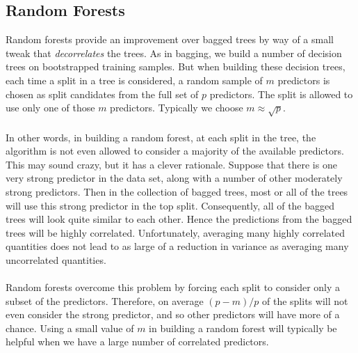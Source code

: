 \subsection{Random Forests}
Random forests provide an improvement over bagged trees by way of a small tweak that \textit{decorrelates} the trees. As in bagging, we build a number of decision trees on bootstrapped training samples. But when building these decision trees, each time a split in a tree is considered, a random sample of $m$ predictors is chosen as split candidates from the full set of $p$ predictors. The split is allowed to use only one of those $m$ predictors. Typically we choose $m \approx \sqrt{p}$.\\\\
In other words, in building a random forest, at each split in the tree,
the algorithm is not even allowed to consider a majority of the available
predictors. This may sound crazy, but it has a clever rationale. Suppose that there is one very strong predictor in the data set, along with a number of other moderately strong predictors. Then in the collection of bagged trees, most or all of the trees will use this strong predictor in the top split. Consequently, all of the bagged trees will look quite similar to each other. Hence the predictions from the bagged trees will be highly correlated. Unfortunately,  averaging many highly correlated quantities does not lead to as large of a reduction in variance as averaging many uncorrelated quantities.\\\\
Random forests overcome this problem by forcing each split to consider only a subset of the predictors. Therefore, on average $(p - m)/p$ of the splits will not even consider the strong predictor, and so other predictors will have more of a chance. Using a small value of $m$ in building a random forest will typically be helpful when we have a large number of correlated predictors.
